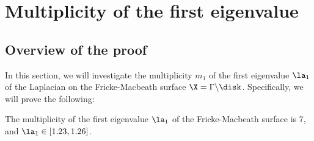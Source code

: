 

\section{Multiplicity of the first eigenvalue}
\subsection{Overview of the proof}
In this section, we will investigate the multiplicity $m_1$ of the first eigenvalue $\la_1$ of the Laplacian on the Fricke-Macbeath surface $\X=\Gamma\backslash\disk$.
Specifically, we will prove the following:
\begin{theorem}\label{thm:mult7}
The multiplicity of the first eigenvalue $\la_1$ of the Fricke-Macbeath surface is 7, and $\la_1\in [1.23, 1.26]$.
\end{theorem}


